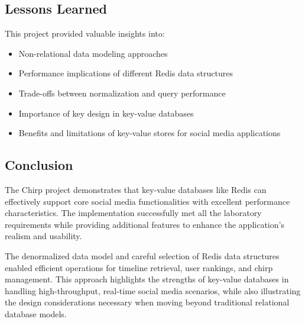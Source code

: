 \documentclass[a4paper,11pt]{article}
\begin{document}
\subsection{Lessons Learned}
This project provided valuable insights into:

\begin{itemize}
    \item Non-relational data modeling approaches
    \item Performance implications of different Redis data structures
    \item Trade-offs between normalization and query performance
    \item Importance of key design in key-value databases
    \item Benefits and limitations of key-value stores for social media applications
\end{itemize}

\subsection{Conclusion}
The Chirp project demonstrates that key-value databases like Redis can effectively support core social media functionalities with excellent performance characteristics. The implementation successfully met all the laboratory requirements while providing additional features to enhance the application's realism and usability.

The denormalized data model and careful selection of Redis data structures enabled efficient operations for timeline retrieval, user rankings, and chirp management. This approach highlights the strengths of key-value databases in handling high-throughput, real-time social media scenarios, while also illustrating the design considerations necessary when moving beyond traditional relational database models.
\end{document}

